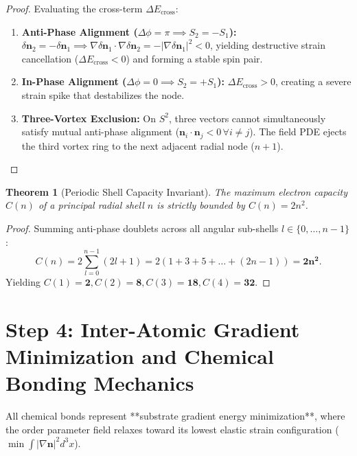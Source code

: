 \documentclass[11pt,a4paper]{article}
\newtheorem{thm}{Theorem}
\begin{document}
	\begin{proof}
		Evaluating the cross-term $\Delta E_{\text{cross}}$:
		\begin{enumerate}
			\item \textbf{Anti-Phase Alignment ($\Delta \phi = \pi \implies S_2 = -S_1$):} $\delta \mathbf{n}_2 = -\delta \mathbf{n}_1 \implies \nabla \delta \mathbf{n}_1 \cdot \nabla \delta \mathbf{n}_2 = -|\nabla \delta \mathbf{n}_1|^2 < 0$, yielding destructive strain cancellation ($\Delta E_{\text{cross}} < 0$) and forming a stable spin pair.
			\item \textbf{In-Phase Alignment ($\Delta \phi = 0 \implies S_2 = +S_1$):} $\Delta E_{\text{cross}} > 0$, creating a severe strain spike that destabilizes the node.
			\item \textbf{Three-Vortex Exclusion:} On $S^2$, three vectors cannot simultaneously satisfy mutual anti-phase alignment ($\mathbf{n}_i \cdot \mathbf{n}_j < 0 \, \forall i \neq j$). The field PDE ejects the third vortex ring to the next adjacent radial node ($n+1$).
		\end{enumerate}
	\end{proof}
	
	\begin{thm}[Periodic Shell Capacity Invariant]
		\label{thm:shell_capacity}
		The maximum electron capacity $C(n)$ of a principal radial shell $n$ is strictly bounded by $C(n) = 2 n^2$.
	\end{thm}
	
	\begin{proof}
		Summing anti-phase doublets across all angular sub-shells $l \in \{0, \dots, n-1\}$:
		\begin{equation}
			C(n) = 2 \sum_{l=0}^{n-1} (2l + 1) = 2 \left( 1 + 3 + 5 + \dots + (2n - 1) \right) = \mathbf{2 n^2}.
		\end{equation}
		Yielding $C(1)=\mathbf{2}, C(2)=\mathbf{8}, C(3)=\mathbf{18}, C(4)=\mathbf{32}$.
	\end{proof}
	
	\section{Step 4: Inter-Atomic Gradient Minimization and Chemical Bonding Mechanics}
	\label{sec:step4_chemical_bonding}
	
	All chemical bonds represent **substrate gradient energy minimization**, where the order parameter field relaxes toward its lowest elastic strain configuration ($\min \int |\nabla \mathbf{n}|^2 d^3x$).
	
\end{document}
